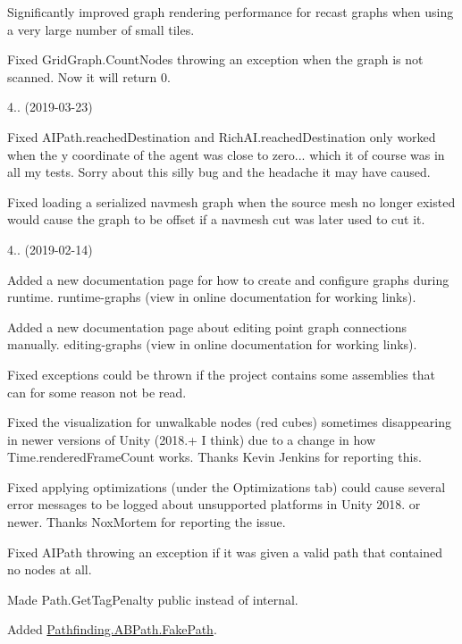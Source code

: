 \begin{DoxyItemize}
\begin{DoxyItemize}
\item Significantly improved graph rendering performance for recast graphs when using a very large number of small tiles.
\item Fixed Grid\+Graph.\+Count\+Nodes throwing an exception when the graph is not scanned. Now it will return 0.
\end{DoxyItemize}
\item 4.. (2019-\/03-\/23)
\begin{DoxyItemize}
\item Fixed A\+I\+Path.\+reached\+Destination and Rich\+A\+I.\+reached\+Destination only worked when the y coordinate of the agent was close to zero... which it of course was in all my tests. Sorry about this silly bug and the headache it may have caused.
\item Fixed loading a serialized navmesh graph when the source mesh no longer existed would cause the graph to be offset if a navmesh cut was later used to cut it.
\end{DoxyItemize}
\item 4.. (2019-\/02-\/14)
\begin{DoxyItemize}
\item Added a new documentation page for how to create and configure graphs during runtime. runtime-\/graphs (view in online documentation for working links).
\item Added a new documentation page about editing point graph connections manually. editing-\/graphs (view in online documentation for working links).
\item Fixed exceptions could be thrown if the project contains some assemblies that can for some reason not be read.
\item Fixed the visualization for unwalkable nodes (red cubes) sometimes disappearing in newer versions of Unity (2018.+ I think) due to a change in how Time.\+rendered\+Frame\+Count works. Thanks Kevin Jenkins for reporting this.
\item Fixed applying optimizations (under the Optimizations tab) could cause several error messages to be logged about unsupported platforms in Unity 2018. or newer. Thanks Nox\+Mortem for reporting the issue.
\item Fixed A\+I\+Path throwing an exception if it was given a valid path that contained no nodes at all.
\item Made Path.\+Get\+Tag\+Penalty public instead of internal.
\item Added \mbox{\hyperlink{class_pathfinding_1_1_a_b_path_ae0abcb1ed0acab5635ced85fee38266a}{Pathfinding.\+A\+B\+Path.\+Fake\+Path}}.

\end{DoxyItemize}
\end{DoxyItemize}
